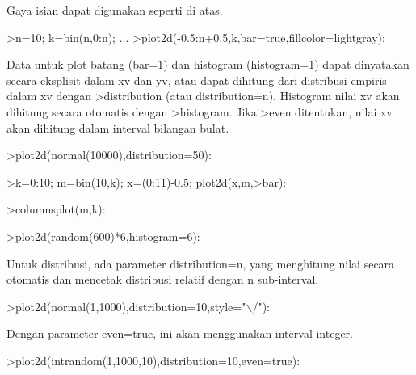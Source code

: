 \documentclass{article}
\begin{document}
\begin{eulernotebook}
\begin{eulercomment}
\begin{eulercomment}
\begin{eulercomment}
\begin{eulercomment}
\begin{eulercomment}
Gaya isian dapat digunakan seperti di atas.
\end{eulercomment}
\begin{eulerprompt}
>n=10; k=bin(n,0:n); ...
>plot2d(-0.5:n+0.5,k,bar=true,fillcolor=lightgray):
\end{eulerprompt}
\begin{eulercomment}
Data untuk plot batang (bar=1) dan histogram (histogram=1) dapat
dinyatakan secara eksplisit dalam xv dan yv, atau dapat dihitung dari
distribusi empiris dalam xv dengan \textgreater{}distribution (atau
distribution=n). Histogram nilai xv akan dihitung secara otomatis
dengan \textgreater{}histogram. Jika \textgreater{}even ditentukan, nilai xv akan dihitung dalam
interval bilangan bulat.
\end{eulercomment}
\begin{eulerprompt}
>plot2d(normal(10000),distribution=50):
\end{eulerprompt}
\begin{eulerprompt}
>k=0:10; m=bin(10,k); x=(0:11)-0.5; plot2d(x,m,>bar):
\end{eulerprompt}
\begin{eulerprompt}
>columnsplot(m,k):
\end{eulerprompt}
\begin{eulerprompt}
>plot2d(random(600)*6,histogram=6):
\end{eulerprompt}
\begin{eulercomment}
Untuk distribusi, ada parameter distribution=n, yang menghitung nilai
secara otomatis dan mencetak distribusi relatif dengan n sub-interval.
\end{eulercomment}
\begin{eulerprompt}
>plot2d(normal(1,1000),distribution=10,style="\(\backslash\)/"):
\end{eulerprompt}
\begin{eulercomment}
Dengan parameter even=true, ini akan menggunakan interval integer.
\end{eulercomment}
\begin{eulerprompt}
>plot2d(intrandom(1,1000,10),distribution=10,even=true):

\end{eulerprompt}
\end{eulercomment}
\end{eulercomment}
\end{eulercomment}
\end{eulercomment}
\end{eulernotebook}
\end{document}
